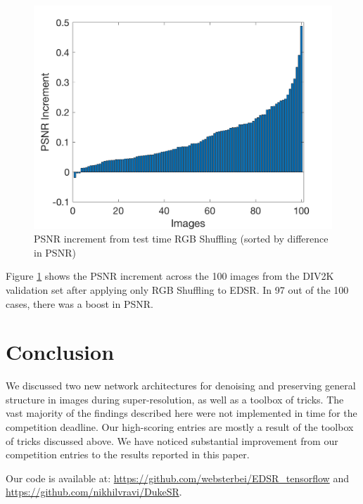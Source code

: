 \documentclass[10pt,twocolumn,letterpaper]{article}
\begin{document}
\begin{figure}[ht]
    \centering
    \includegraphics[width=\columnwidth]{Images/RGBShuffling.png}
    \caption{PSNR increment from test time RGB Shuffling (sorted by difference in PSNR)}
    \label{fig:rgbshuffling}
\end{figure}

Figure \ref{fig:rgbshuffling} shows the PSNR increment across the 100 images from the DIV2K validation set after applying only RGB Shuffling to EDSR. In 97 out of the 100 cases, there was a boost in PSNR.
\section{Conclusion}
We discussed two new network architectures for denoising and preserving general structure in images during super-resolution, as well as a toolbox of tricks. The vast majority of the findings described here were not implemented in time for the competition deadline. Our high-scoring entries are mostly a result of the toolbox of tricks discussed above. 
We have noticed substantial improvement from our competition entries to the results reported in this paper.

Our code is available at: \url{https://github.com/websterbei/EDSR_tensorflow} and \url{https://github.com/nikhilvravi/DukeSR}.
\end{document}
